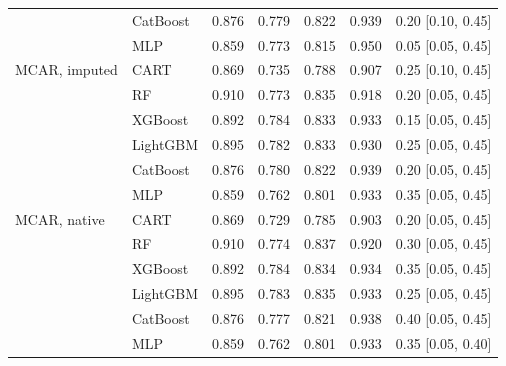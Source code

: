 \begin{table}[p]
\begin{tabular}{@{}llrrrrl@{}}
 & CatBoost & 0.876 & 0.779 & 0.822 & 0.939 & 0.20 [0.10, 0.45] \\
 & MLP & 0.859 & 0.773 & 0.815 & 0.950 & 0.05 [0.05, 0.45] \\
\midrule
MCAR, imputed & CART & 0.869 & 0.735 & 0.788 & 0.907 & 0.25 [0.10, 0.45] \\
 & RF & 0.910 & 0.773 & 0.835 & 0.918 & 0.20 [0.05, 0.45] \\
 & XGBoost & 0.892 & 0.784 & 0.833 & 0.933 & 0.15 [0.05, 0.45] \\
 & LightGBM & 0.895 & 0.782 & 0.833 & 0.930 & 0.25 [0.05, 0.45] \\
 & CatBoost & 0.876 & 0.780 & 0.822 & 0.939 & 0.20 [0.05, 0.45] \\
 & MLP & 0.859 & 0.762 & 0.801 & 0.933 & 0.35 [0.05, 0.45] \\
\midrule
MCAR, native & CART & 0.869 & 0.729 & 0.785 & 0.903 & 0.20 [0.05, 0.45] \\
 & RF & 0.910 & 0.774 & 0.837 & 0.920 & 0.30 [0.05, 0.45] \\
 & XGBoost & 0.892 & 0.784 & 0.834 & 0.934 & 0.35 [0.05, 0.45] \\
 & LightGBM & 0.895 & 0.783 & 0.835 & 0.933 & 0.25 [0.05, 0.45] \\
 & CatBoost & 0.876 & 0.777 & 0.821 & 0.938 & 0.40 [0.05, 0.45] \\
 & MLP & 0.859 & 0.762 & 0.801 & 0.933 & 0.35 [0.05, 0.40] \\
\bottomrule
\end{tabular}
\end{table}

